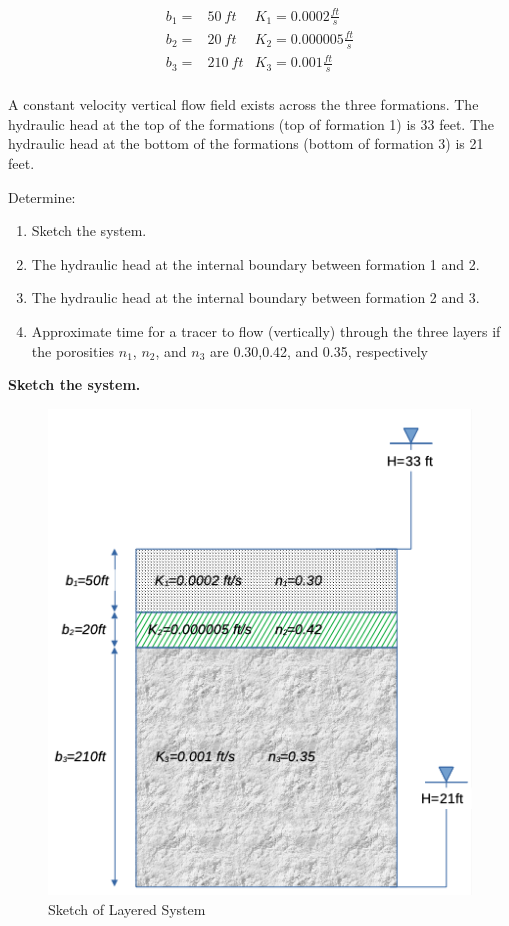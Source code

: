 \documentclass[12pt]{article}
\begin{document}
\begin{enumerate}
\begin{equation}
  \begin{aligned}
b_1 = & 50~ft &K_1 =   0.0002 \frac{ft}{s} \\ 
b_2 = & 20~ft &K_2 = 0.000005 \frac{ft}{s} \\
b_3 = &210~ft &K_3 =    0.001 \frac{ft}{s} \\
  \end{aligned}
\end{equation}

A constant velocity vertical flow field exists across the three formations.
The hydraulic head at the top of the formations (top of formation 1) is 33 feet.  The hydraulic head at the bottom of the formations (bottom of formation 3) is 21 feet.

Determine:
\begin{enumerate}
\item Sketch the system.
\item The hydraulic head at the internal boundary between formation 1 and 2.
\item The hydraulic head at the internal boundary between formation 2 and 3.
\item Approximate time for a tracer to flow (vertically) through the three layers if the porosities $n_1$, $n_2$, and $n_3$ are 0.30,0.42, and 0.35, respectively
\end{enumerate}

\clearpage

\textbf{Sketch the system.}

\begin{figure}[h!] %
   \centering
   \includegraphics[width=5in]{es1-3-sketch.png} 
   \caption{Sketch of Layered System}
   \label{fig:headlayer1}
\end{figure}


\end{enumerate}
\end{document}
